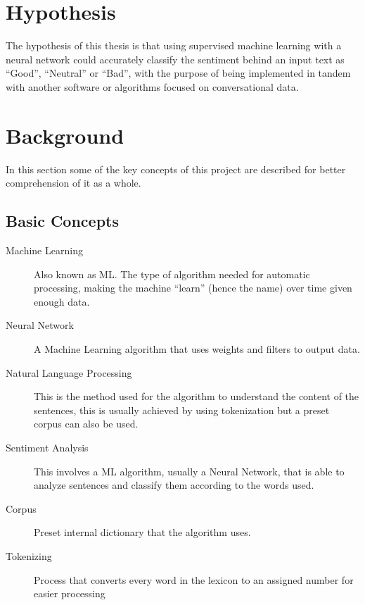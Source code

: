 \documentclass[review]{elsarticle} %
\begin{document}
\section{Hypothesis}
The hypothesis of this thesis is that using supervised machine learning with a neural network could accurately classify the sentiment behind an input text as ``Good'', ``Neutral'' or ``Bad'', with the purpose of being implemented in tandem with another software or algorithms focused on conversational data.

\section{Background}
In this section some of the key concepts of this project are described for better comprehension of it as a whole.
\subsection{Basic Concepts}
\begin{description}
	\item[Machine Learning]{Also known as ML. The type of algorithm needed for automatic processing, making the machine ``learn'' (hence the name) over time given enough data.}
	\item[Neural Network]{A Machine Learning algorithm that uses weights and filters to output data.}
	\item[Natural Language Processing]{This is the method used for the algorithm to understand the content of the sentences, this is usually achieved by using tokenization but a preset corpus can also be used.}	
	\item[Sentiment Analysis]{This involves a ML algorithm, usually a Neural Network, that is able to analyze sentences and classify them according to the words used.}
	\item[Corpus]{Preset internal dictionary that the algorithm uses.}
	\item[Tokenizing]{Process that converts every word in the lexicon to an assigned number for easier processing}
\end{description}
\end{document}
